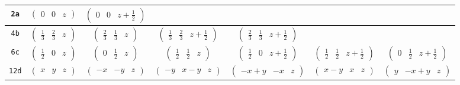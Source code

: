 \documentclass[fleqn,9pt,landscape]{jsarticle}
\begin{document}
\begin{center}
\begin{longtable}{ccccccc}
{\tt 2a} & $ \begin{pmatrix} 0 & 0 & z \end{pmatrix} $ & $ \begin{pmatrix} 0 & 0 & z + \frac{1}{2} \end{pmatrix} $ & $  $ & $  $ & $  $ & $  $ \\ \hline
{\tt 4b} & $ \begin{pmatrix} \frac{1}{3} & \frac{2}{3} & z \end{pmatrix} $ & $ \begin{pmatrix} \frac{2}{3} & \frac{1}{3} & z \end{pmatrix} $ & $ \begin{pmatrix} \frac{1}{3} & \frac{2}{3} & z + \frac{1}{2} \end{pmatrix} $ & $ \begin{pmatrix} \frac{2}{3} & \frac{1}{3} & z + \frac{1}{2} \end{pmatrix} $ & $  $ & $  $ \\ \hline
{\tt 6c} & $ \begin{pmatrix} \frac{1}{2} & 0 & z \end{pmatrix} $ & $ \begin{pmatrix} 0 & \frac{1}{2} & z \end{pmatrix} $ & $ \begin{pmatrix} \frac{1}{2} & \frac{1}{2} & z \end{pmatrix} $ & $ \begin{pmatrix} \frac{1}{2} & 0 & z + \frac{1}{2} \end{pmatrix} $ & $ \begin{pmatrix} \frac{1}{2} & \frac{1}{2} & z + \frac{1}{2} \end{pmatrix} $ & $ \begin{pmatrix} 0 & \frac{1}{2} & z + \frac{1}{2} \end{pmatrix} $ \\ \hline
{\tt 12d} & $ \begin{pmatrix} x & y & z \end{pmatrix} $ & $ \begin{pmatrix} - x & - y & z \end{pmatrix} $ & $ \begin{pmatrix} - y & x - y & z \end{pmatrix} $ & $ \begin{pmatrix} - x + y & - x & z \end{pmatrix} $ & $ \begin{pmatrix} x - y & x & z \end{pmatrix} $ & $ \begin{pmatrix} y & - x + y & z \end{pmatrix} $ \\

\end{longtable}
\end{center}
\end{document}
